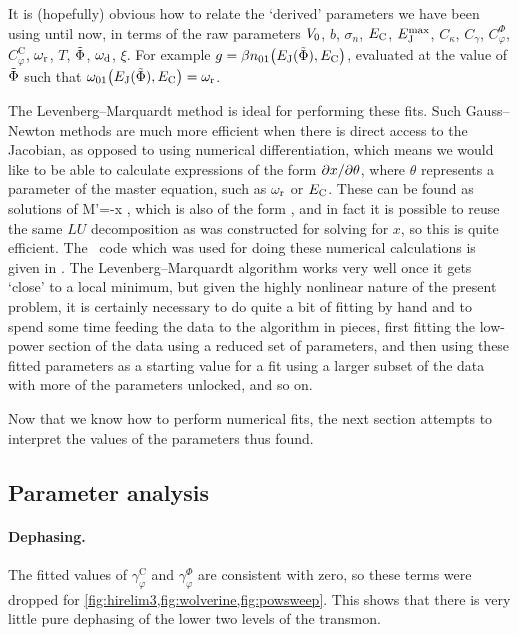 It is (hopefully) obvious how to relate the `derived' parameters we have been using until now, in terms of the raw parameters $V_0$, $b$, $\sigma_n$, $E_{\text{C}}$, $E_{\text{J}}^\text{max}$, $C_\kappa$, $C_\gamma$, $C_\varphi^\Phi$, $C_\varphi^\text{C}$, $\omega_{\text{r}}$, $T$, $\tilde{\Phi}$, $\omega_{\text{d}}$, $\xi$. For example $g=\beta n_{01}\big(E_{\text{J}}(\tilde{\Phi}),E_{\text{C}}\big)$, evaluated at the value of $\tilde{\Phi}$ such that $\omega_{01}\big(E_{\text{J}}(\tilde{\Phi}),E_{\text{C}}\big)=\omega_{\text{r}}$.

The Levenberg--Marquardt method is ideal for performing these fits. Such Gauss--Newton methods are much more efficient when there is direct access to the Jacobian, as opposed to using numerical differentiation,  which means we would like to be able to calculate expressions of the form $\partial x/\partial \theta$, where $\theta$ represents a parameter of the master equation, such as $\omega_{\text{r}}$ or $E_{\text{C}}$. These can be found as solutions of
\be\label{eq:jac}
    M'\cdot{}=-\cdot x ,
\ee
which is also of the form , and in fact it is possible to reuse the same $LU$ decomposition as was constructed for solving for $x$, so this is quite efficient. The \mma\ code which was used for doing these numerical calculations is given in . The Levenberg--Marquardt algorithm works very well once it gets `close' to a local minimum, but given the highly nonlinear nature of the present problem, it is certainly necessary to do quite a bit of fitting by hand and to spend some time feeding the data to the algorithm in pieces, first fitting the low-power section of the data using a reduced set of parameters, and then using these fitted parameters as a starting value for a fit using a larger subset of the data with more of the parameters unlocked, and so on.

Now that we know how to perform numerical fits, the next section attempts to interpret the values of the parameters thus found.

\subsection{Parameter analysis}\label{sec:nodissip}
\paragraph{Dephasing.}The fitted values of $\gamma_\varphi^\text{C}$ and $\gamma_\varphi^\Phi$ are consistent with zero, so these terms were dropped for  \cref{fig:hirelim3,fig:wolverine,fig:powsweep}. This shows that there is very little pure dephasing of the lower two levels of the transmon.

